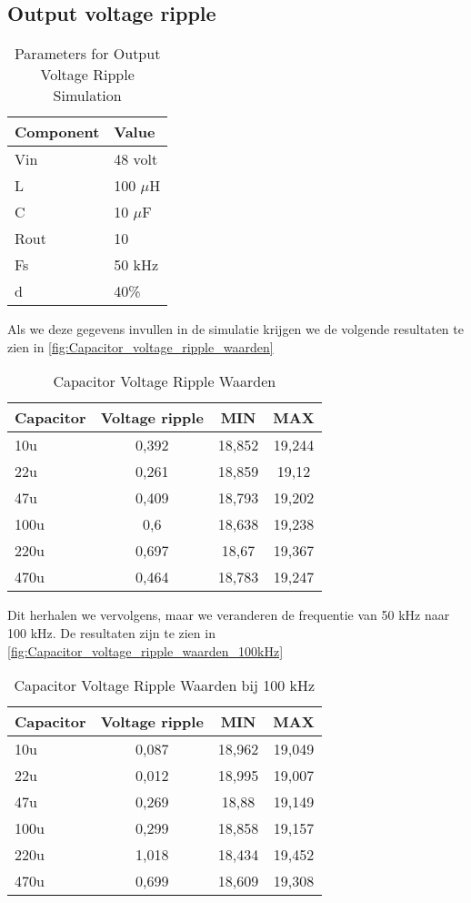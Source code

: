 \subsection{Output voltage ripple}
\begin{table}[h!]
\centering
\begin{tabular}{|l|l|}
\hline
\textbf{Component} & \textbf{Value} \\
\hline
Vin  & 48 volt \\
L    & 100 $\mu$H \\
C    & 10 $\mu$F \\
Rout & 10 \\
Fs   & 50 kHz \\
d    & 40\% \\
\hline
\end{tabular}
\caption{Parameters for Output Voltage Ripple Simulation}
\label{fig:Output_voltage_ripple_simulation}
\end{table}
Als we deze gegevens invullen in de simulatie krijgen we de volgende resultaten te zien in \autoref{fig:Capacitor_voltage_ripple_waarden}
\begin{table}[h!]
\centering
\begin{tabular}{|l|c|c|c|}
\hline
\textbf{Capacitor} & \textbf{Voltage ripple} & \textbf{MIN} & \textbf{MAX} \\
\hline
10u   & 0,392 & 18,852 & 19,244 \\
22u   & 0,261 & 18,859 & 19,12  \\
47u   & 0,409 & 18,793 & 19,202 \\
100u  & 0,6   & 18,638 & 19,238 \\
220u  & 0,697 & 18,67  & 19,367 \\
470u  & 0,464 & 18,783 & 19,247 \\
\hline
\end{tabular}
\caption{Capacitor Voltage Ripple Waarden}
\label{fig:Capacitor_voltage_ripple_waarden}
\end{table}

Dit herhalen we vervolgens, maar we veranderen de frequentie van 50 kHz naar 100 kHz. De resultaten zijn te zien in \autoref{fig:Capacitor_voltage_ripple_waarden_100kHz}
\begin{table}[h!]
\centering
\begin{tabular}{|l|c|c|c|}
\hline
\textbf{Capacitor} & \textbf{Voltage ripple} & \textbf{MIN} & \textbf{MAX} \\
\hline
10u   & 0,087 & 18,962 & 19,049 \\
22u   & 0,012 & 18,995 & 19,007 \\
47u   & 0,269 & 18,88  & 19,149 \\
100u  & 0,299 & 18,858 & 19,157 \\
220u  & 1,018 & 18,434 & 19,452 \\
470u  & 0,699 & 18,609 & 19,308 \\
\hline
\end{tabular}
\caption{Capacitor Voltage Ripple Waarden bij 100 kHz}
\label{fig:Capacitor_voltage_ripple_waarden_100kHz}
\end{table}